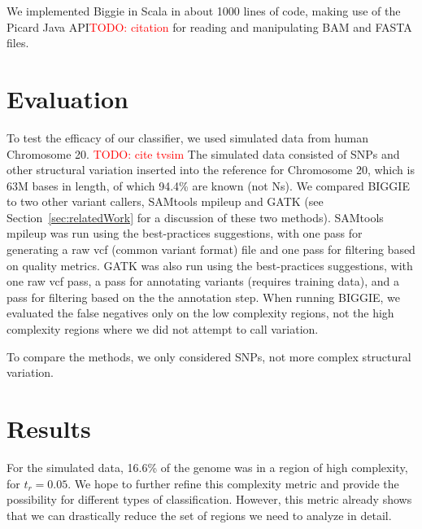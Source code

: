 \documentclass[10pt]{article}
\newcommand\TODO[1]{\textcolor{red}{TODO: #1}}
\begin{document}
We implemented Biggie in Scala in about 1000 lines of code, making use of the Picard Java API\TODO{citation} for reading and manipulating BAM and FASTA files.


\section{Evaluation}

To test the efficacy of our classifier, we used
simulated data from human Chromosome 20. \TODO{cite tvsim} The simulated data consisted of SNPs and other structural variation 
inserted into the reference for Chromosome 20, which is $63$M bases in length,
of which 94.4\% are known (not Ns).
We compared BIGGIE to two other variant callers, SAMtools mpileup and GATK (see Section~\ref{sec:relatedWork} for a discussion of these two methods). SAMtools mpileup was run using the best-practices suggestions, with one pass for generating a raw vcf (common variant format) file and one pass for filtering based on quality metrics. GATK was also run using the best-practices suggestions, with one raw vcf pass, a pass for annotating variants (requires training data), and a pass for filtering based on the the annotation step. When running BIGGIE, we evaluated the false negatives only on the low complexity regions, not the high complexity regions where we did not attempt to call variation.

To compare the methods, we only considered SNPs, not more complex structural variation.

\section{Results}

For the simulated data, 16.6\% of the genome was in a region of high complexity, for $t_r =0.05$. 
We hope to further refine this complexity metric and provide the possibility for different types
of classification.  However, this metric already shows that we can drastically
reduce the set of regions we need to analyze in detail.
\end{document}
